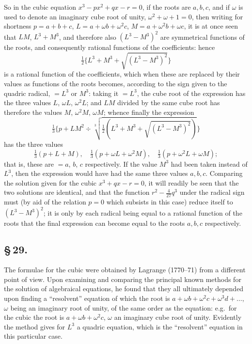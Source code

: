 \documentclass[11pt,a4paper]{article}
\begin{document}
So in the cubic equation $x^{3} - px^{2} + qx - r = 0$, if the roots are $a, b, c$, and if $\omega$ is used to denote an imaginary cube root of unity, $\omega^{2} + \omega + 1 = 0$, then writing for shortness $p = a + b + c$, $L = a + \omega b + \omega^{2}c$, $M = a + \omega^{2}b + \omega c$, it is at once seen that $LM$, $L^{3} + M^{3}$, and therefore also $(L^{3} - M^{3})^{2}$ are symmetrical functions of the roots, and consequently rational functions of the coefficients: hence
\[
\tfrac{1}{2}\{L^{3} + M^{3} + \sqrt{(L^{3} - M^{3})^{2}}\}
\]
is a rational function of the coefficients, which when these are replaced by their values as functions of the roots becomes, according to the sign given to the quadric radical, $= L^{3}$ or $M^{3}$: taking it $= L^{3}$, the cube root of the expression has the three values $L$, $\omega L$, $\omega^{2}L$; and $LM$ divided by the same cube root has therefore the values $M$, $\omega^{2}M$, $\omega M$; whence finally the expression
\[
\tfrac{1}{3}\{p + LM^{2} \div \sqrt[3]{\tfrac{1}{2}(L^{3} + M^{3} + \sqrt{(L^{3} - M^{3})^{2}})}\}
\]
has the three values
\[
\tfrac{1}{3}(p + L + M), \quad \tfrac{1}{3}(p + \omega L + \omega^{2}M), \quad \tfrac{1}{3}(p + \omega^{2}L + \omega M);
\]
that is, these are $= a$, $b$, $c$ respectively. If the value $M^{3}$ had been taken instead of $L^{3}$, then the expression would have had the same three values $a, b, c$. Comparing the solution given for the cubic $x^{3} + qx - r = 0$, it will readily be seen that the two solutions are identical, and that the function $r^{2} - \frac{4}{27}q^{3}$ under the radical sign must (by aid of the relation $p = 0$ which subsists in this case) reduce itself to $(L^{3} - M^{3})^{2}$; it is only by each radical being equal to a rational function of the roots that the final expression can become equal to the roots $a, b, c$ respectively.

\subsection*{\S\,29.}

The formulae for the cubic were obtained by Lagrange (1770--71) from a different point of view. Upon examining and comparing the principal known methods for the solution of algebraical equations, he found that they all ultimately depended upon finding a ``resolvent'' equation of which the root is $a + \omega b + \omega^{2}c + \omega^{3}d + \ldots$, $\omega$ being an imaginary root of unity, of the same order as the equation: e.g.\ for the cubic the root is $a + \omega b + \omega^{2}c$, $\omega$ an imaginary cube root of unity. Evidently the method gives for $L^{3}$ a quadric equation, which is the ``resolvent'' equation in this particular case.
\end{document}
